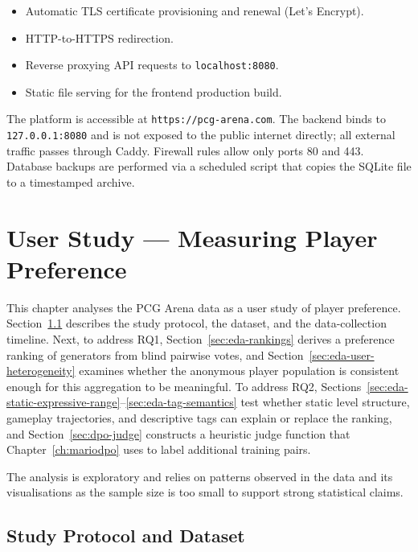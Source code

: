 \documentclass[shortabstract, mgr, english]{iithesis}
\begin{document}
\begin{itemize}[nosep]
    \item Automatic TLS certificate provisioning and renewal (Let's Encrypt).
    \item HTTP-to-HTTPS redirection.
    \item Reverse proxying API requests to \texttt{localhost:8080}.
    \item Static file serving for the frontend production build.
\end{itemize}

The platform is accessible at \texttt{https://pcg-arena.com}. The backend binds to
\texttt{127.0.0.1:8080} and is not exposed to the public internet directly; all external
traffic passes through Caddy. Firewall rules allow only ports 80 and 443. Database backups
are performed via a scheduled script that copies the SQLite file to a timestamped archive.




\chapter{User Study --- Measuring Player Preference}
\label{ch:eda}

This chapter analyses the PCG Arena data as a user study of player
preference. Section~\ref{sec:eda-study-design} describes the study protocol,
the dataset, and the data-collection timeline. Next, to address RQ1,
Section~\ref{sec:eda-rankings} derives a
preference ranking of generators from blind pairwise votes, and
Section~\ref{sec:eda-user-heterogeneity} examines whether the anonymous player
population is consistent enough for this aggregation to be meaningful. To address RQ2,
Sections~\ref{sec:eda-static-expressive-range}--\ref{sec:eda-tag-semantics}
test whether static level structure, gameplay trajectories, and descriptive
tags can explain or replace the ranking, and Section~\ref{sec:dpo-judge}
constructs a heuristic judge function that Chapter~\ref{ch:mariodpo} uses to label
additional training pairs.

The analysis is exploratory and relies on patterns observed in the data and its visualisations as the sample size is too small to support strong statistical claims.

\section{Study Protocol and Dataset}
\label{sec:eda-study-design}
\end{document}
